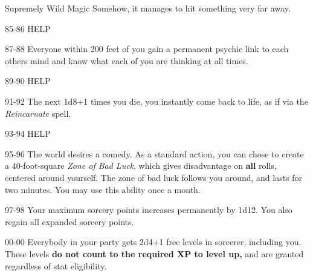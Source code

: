 \begin{rolltable}{Supremely Wild Magic}
Somehow, it manages to hit something very far away.
\item[85-86] HELP
\item[87-88] Everyone within 200 feet of you gain a permanent psychic link to each others mind and know what each of you are thinking at all times.
\item[89-90] HELP
\item[91-92] The next 1d8+1 times you die, you instantly come back to life, as if via the \textit{Reincarnate} spell. 
\item[93-94] HELP
\item[95-96] The world desires a comedy.
As a standard action, you can chose to create a 40-foot-square \textit{Zone of Bad Luck}, which gives disadvantage on \textbf{all} rolls, centered around yourself.
The zone of bad luck follows you around, and lasts for two minutes.
You may use this ability once a month.
\item[97-98] Your maximum sorcery points increases permanently by 1d12.
You also regain all expanded sorcery points.
\item[00-00] Everybody in your party gets 2d4+1 free levels in sorcerer, including you. These levels \textbf{do not count to the required XP to level up,} and are granted regardless of stat eligibility.
\end{rolltable}